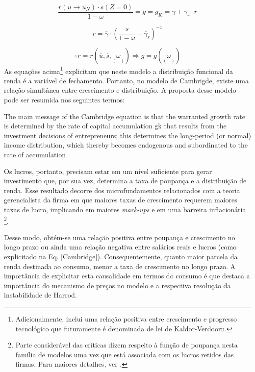 $$
\frac{r(u \to u_N)\cdot s(Z=0)}{1-\omega} = g = g_K = \overline \gamma + \overline \gamma_r\cdot r
$$

$$
r = \overline \gamma\cdot \left(\frac{s}{1-\omega} - \overline \gamma_r\right)^{-1}
$$

\begin{equation}
\label{Cambridge}
\therefore r = r(\overline u, \overline s, \underset{(-)}{\omega}) \Rightarrow g = g(\underset{(-)}{\omega})
\end{equation}
As equações acima\footnote{Adicionalmente, \textcite{kaldor_model_1957} inclui uma relação positiva entre crescimento e progresso tecnológico que futuramente é denominada de lei de Kaldor-Verdoorn.} explicitam que neste modelo a distribuição funcional da renda é a variável de fechamento. Portanto, no modelo de Cambrigde, existe uma relação simultânea entre crescimento e distribuição. A proposta desse modelo pode ser resumida nos seguintes termos:

\begin{citacao}
The main message of the Cambridge
equation is that the warranted growth rate is determined by the rate of capital
accumulation gk that results from the investment decisions of entrepreneurs; this
determines the long-period (or normal) income distribution, which thereby
becomes endogenous and subordinated to the rate of accumulation \cite[p.~158]{cesaratto_neo-kaleckian_2015}
\end{citacao}
Os lucros, portanto, precisam estar em um nível suficiente para gerar investimento que, por sua vez, determina a taxa de poupança e a distribuição de renda. Esse resultado decorre dos microfundamentos relacionados com a teoria gerencialista da firma em que maiores taxas de crescimento requerem maiores taxas de lucro, implicando em maiores \textit{mark-ups} e em uma barreira inflacionária \cite[p.~353]{lavoie_post-keynesian_2015} \footnote{Parte considerável das críticas dizem respeito à função de poupança nesta família de modelos uma vez que está associada com os lucros retidos das firmas. Para maiores detalhes, ver  \textcites[Seção III]{skott_kaldoriansaving_1981}{marglin_foundation_1984}{skott_kaldors_1989}.}. 

Desse modo, obtém-se uma relação positiva entre poupança e crescimento no longo prazo ou ainda uma relação negativa entre salários reais e lucros (como explicitado na Eq. \ref{Cambridge}). Consequentemente, quanto maior parcela da renda destinada ao consumo, menor a taxa de crescimento no longo prazo. A importância de explicitar esta causalidade em termos do consumo é que destaca a importância do mecanismo de preços no modelo e a respectiva resolução da instabilidade de Harrod. 

